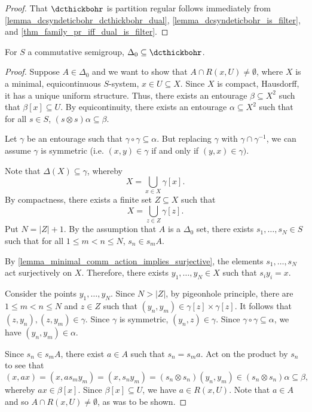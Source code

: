 \begin{proof}
    That $\dcthickbohr$ is partition regular follows immediately from \cref{lemma_dcsyndeticbohr_dcthickbohr_dual}, \cref{lemma_dcsyndeticbohr_is_filter}, and \cref{thm_family_pr_iff_dual_is_filter}.
\end{proof}

\begin{theorem}
    \label{thm_delta_zero_set_of_bohr_rec}
    \label{commDeltaZeroImpliesSetOfBohrRecurrence}
    \leanok{}
    For $S$ a commutative semigroup, $\Delta_0 \subseteq \dcthickbohr$.
\end{theorem}

\begin{proof}
    Suppose $A \in \Delta_0$ and we want to show that $A \cap R(x,U) \neq \emptyset$, where $X$ is a minimal, equicontinuous $S$-system, $x \in U \subseteq X$.  Since $X$ is compact, Hausdorff, it has a unique uniform structure.  Thus, there exists an entourage $\beta \subseteq X^2$ such that $\beta[x] \subseteq U$.  By equicontinuity, there exists an entourage $\alpha \subseteq X^2$ such that for all $s \in S$, $(s \otimes s) \alpha \subseteq \beta$.

    Let $\gamma$ be an entourage such that $\gamma \circ \gamma \subseteq \alpha$. But replacing $\gamma$ with $\gamma \cap \gamma^{-1}$, we can assume $\gamma$ is symmetric (i.e. $(x, y) \in \gamma$ if and only if $(y, x) \in \gamma)$.
    
    Note that $\Delta(X) \subseteq \gamma$, whereby
    \[
        X = \bigcup_{x \in X} \gamma[x].
    \]
    By compactness, there exists a finite set $Z \subseteq X$ such that
    \[
        X = \bigcup_{z \in Z} \gamma[z].
    \]
    Put $N = |Z|+1$.  By the assumption that $A$ is a $\Delta_0$ set, there exists $s_1, \ldots, s_N \in S$ such that for all $1 \leq m < n \leq N$, $s_n \in s_m A$.
    
    By \cref{lemma_minimal_comm_action_implies_surjective}, the elements $s_1, \ldots, s_N$ act surjectively on $X$.  Therefore, there exists $y_1, \ldots, y_N \in X$ such that $s_i y_i = x$.
    
    Consider the points $y_1, \ldots, y_N$.  Since $N > |Z|$, by pigeonhole principle, there are $1 \leq m < n \leq N$ and $z \in Z$ such that $(y_n, y_m) \in \gamma[z] \times \gamma[z]$. It follows that $(z, y_n), (z, y_m) \in \gamma$. Since $\gamma$ is symmetric, $(y_n, z) \in \gamma$. Since $\gamma \circ \gamma \subseteq \alpha$, we have $(y_n, y_m) \in \alpha$.
    
    Since $s_n \in s_m A$, there exist $a \in A$ such that $s_n = s_m a$.
    Act on the product by $s_n$ to see that
    \[
        (x,a x) = (x, a s_m y_m) = (x, s_n y_m) = (s_n \otimes s_n) (y_n, y_m) \in (s_n \otimes s_n) \alpha \subseteq \beta,
    \]
    whereby $a x \in \beta[x]$. Since $\beta[x] \subseteq U$, we have $a \in R(x,U)$.  Note that $a \in A$ and so $A \cap R(x,U) \neq \emptyset$, as was to be shown.
\end{proof}

